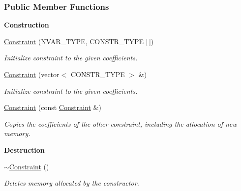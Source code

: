 \subsubsection*{Public Member Functions}
\begin{Indent}\textbf{ Construction}\par
\begin{DoxyCompactItemize}
\item 
\hyperlink{group___c_l_s_solvers_a461ed6a3396f874d12b2aec6996180d9}{Constraint} (N\+V\+A\+R\+\_\+\+T\+Y\+PE, C\+O\+N\+S\+T\+R\+\_\+\+T\+Y\+PE \mbox{[}$\,$\mbox{]})
\begin{DoxyCompactList}\small\item\em Initialize constraint to the given coefficients. \end{DoxyCompactList}\item 
\hyperlink{group___c_l_s_solvers_abc362e0473a75944d6b8830f6dc33846}{Constraint} (vector$<$ C\+O\+N\+S\+T\+R\+\_\+\+T\+Y\+PE $>$ \&)
\begin{DoxyCompactList}\small\item\em Initialize constraint to the given coefficients. \end{DoxyCompactList}\item 
\mbox{\label{group___c_l_s_solvers_aacfc403f974d4749f133aebdc6f1fb63}} 
\hyperlink{group___c_l_s_solvers_aacfc403f974d4749f133aebdc6f1fb63}{Constraint} (const \hyperlink{group___c_l_s_solvers_class_l_p___solvers_1_1_constraint}{Constraint} \&)
\begin{DoxyCompactList}\small\item\em Copies the coefficients of the other constraint, including the allocation of new memory. \end{DoxyCompactList}\end{DoxyCompactItemize}
\end{Indent}
\begin{Indent}\textbf{ Destruction}\par
\begin{DoxyCompactItemize}
\item 
\hyperlink{group___c_l_s_solvers_a2949083e68c41842b613bd8cf78c6389}{$\sim$\+Constraint} ()
\begin{DoxyCompactList}\small\item\em Deletes memory allocated by the constructor. \end{DoxyCompactList}\end{DoxyCompactItemize}
\end{Indent}

